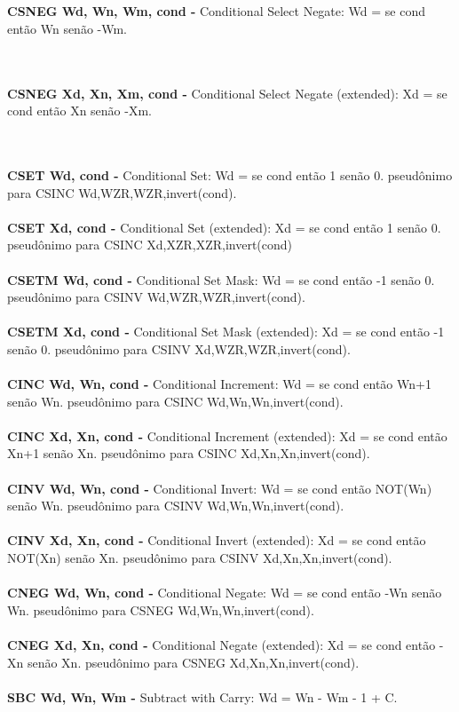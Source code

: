 \documentclass[12pt,a4paper,utf8]{ppgsi}
\begin{document}
\\\\\textbf{CSNEG Wd, Wn, Wm, cond -} Conditional Select Negate: Wd = se cond então Wn senão -Wm. 

\\\\\textbf{CSNEG Xd, Xn, Xm, cond -} Conditional Select Negate (extended): Xd = se cond então Xn senão -Xm. 

\\\\\textbf{CSET Wd, cond -} Conditional Set: Wd = se cond então 1 senão 0.
pseudônimo para CSINC Wd,WZR,WZR,invert(cond). 
\\\\\textbf{CSET Xd, cond -} Conditional Set (extended): Xd = se cond então 1 senão 0.
pseudônimo para CSINC Xd,XZR,XZR,invert(cond)
\\\\\textbf{CSETM Wd, cond -} Conditional Set Mask: Wd = se cond então -1 senão 0.
pseudônimo para CSINV Wd,WZR,WZR,invert(cond).
\\\\\textbf{CSETM Xd, cond -} Conditional Set Mask (extended): Xd = se cond então -1 senão 0.
pseudônimo para CSINV Xd,WZR,WZR,invert(cond). 
\\\\\textbf{CINC Wd, Wn, cond -} Conditional Increment: Wd = se cond então Wn+1 senão Wn.
pseudônimo para CSINC Wd,Wn,Wn,invert(cond).
\\\\\textbf{CINC Xd, Xn, cond -} Conditional Increment (extended): Xd = se cond então Xn+1 senão Xn.
pseudônimo para CSINC Xd,Xn,Xn,invert(cond). 
\\\\\textbf{CINV Wd, Wn, cond -} Conditional Invert: Wd = se cond então NOT(Wn) senão Wn.
pseudônimo para CSINV Wd,Wn,Wn,invert(cond).
\\\\\textbf{CINV Xd, Xn, cond -} Conditional Invert (extended): Xd = se cond então NOT(Xn) senão Xn.
pseudônimo para CSINV Xd,Xn,Xn,invert(cond). 
\\\\\textbf{CNEG Wd, Wn, cond -} Conditional Negate: Wd = se cond então -Wn senão Wn.
pseudônimo para CSNEG Wd,Wn,Wn,invert(cond).
\\\\\textbf{CNEG Xd, Xn, cond -} Conditional Negate (extended): Xd = se cond então -Xn senão Xn.
pseudônimo para CSNEG Xd,Xn,Xn,invert(cond). 
\\\\\textbf{SBC Wd, Wn, Wm -} Subtract with Carry: Wd = Wn - Wm - 1 + C. 
\end{document}
